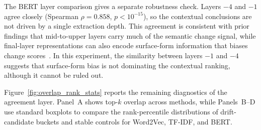 \documentclass[12pt]{article}
\begin{document}
The BERT layer comparison gives a separate robustness check. Layers $-4$ and $-1$ agree closely (Spearman $\rho = 0.858$, $p < 10^{-15}$), so the contextual conclusions are not driven by a single extraction depth. This agreement is consistent with prior findings that mid-to-upper layers carry much of the semantic change signal, while final-layer representations can also encode surface-form information that biases change scores~\cite{laicher-etal-2021-explaining,periti-tahmasebi-2024-systematic}. In this experiment, the similarity between layers $-1$ and $-4$ suggests that surface-form bias is not dominating the contextual ranking, although it cannot be ruled out.


Figure~\ref{fig:overlap_rank_stats} reports the remaining diagnostics of the agreement layer. Panel~A shows top-$k$ overlap across methods, while Panels~B--D use standard boxplots to compare the rank-percentile distributions of drift-candidate buckets and stable controls for Word2Vec, TF-IDF, and BERT.
\end{document}
